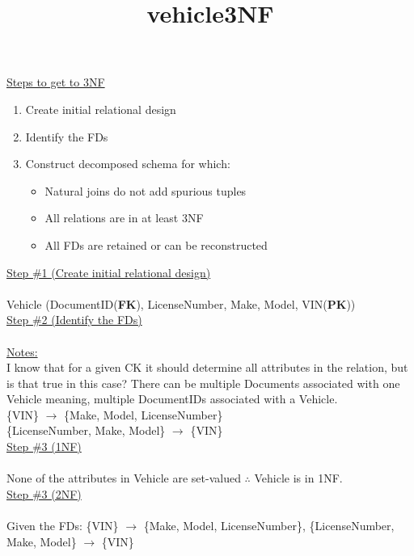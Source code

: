\documentclass[12pt]{article}   %
\title{vehicle3NF}
\begin{document}
\underline{Steps to get to 3NF}
\begin{enumerate}
    \item Create initial relational design
    \item Identify the FDs
    \item Construct decomposed schema for which:
          \begin{itemize}
              \item Natural joins do not add spurious tuples
              \item All relations are in at least 3NF
              \item All FDs are retained or can be reconstructed
          \end{itemize}
\end{enumerate}

\underline{Step \#1 (Create initial relational design)}\\
\\
Vehicle (DocumentID(\textbf{FK}), LicenseNumber, Make, Model, VIN(\textbf{PK}))\\

\underline{Step \#2 (Identify the FDs)}\\
\\
\underline{Notes:}\\
I know that for a given CK it should determine all attributes in the relation, but is that true in this case? There can be multiple Documents associated with one Vehicle meaning, multiple DocumentIDs associated with a Vehicle.\\

\{VIN\} $\longrightarrow$ \{Make, Model, LicenseNumber\}\\
\{LicenseNumber, Make, Model\} $\longrightarrow$ \{VIN\}\\

\underline{Step \#3 (1NF)}\\
\\
None of the attributes in Vehicle are set-valued $\therefore$ Vehicle is in 1NF.\\

\underline{Step \#3 (2NF)}\\
\\
Given the FDs: \{VIN\} $\longrightarrow$ \{Make, Model, LicenseNumber\}, \{LicenseNumber, Make, Model\} $\longrightarrow$ \{VIN\}\\
\end{document}
